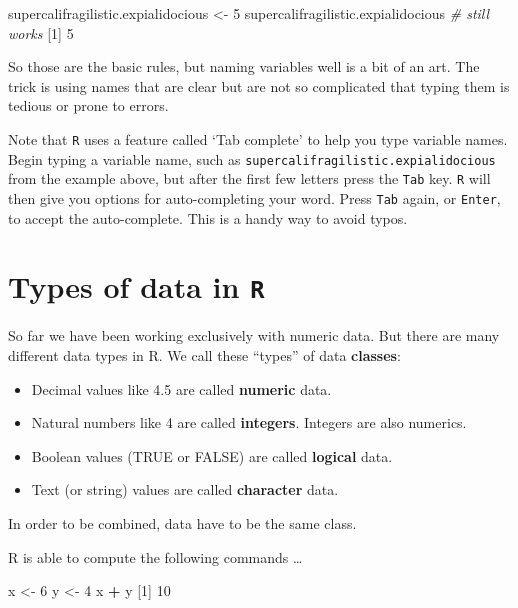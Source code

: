 \documentclass[]{book}
\newenvironment{Shaded}{\begin{snugshade}}{\end{snugshade}}
\newcommand{\CommentTok}[1]{\textcolor[rgb]{0.56,0.35,0.01}{\textit{#1}}}
\newcommand{\DecValTok}[1]{\textcolor[rgb]{0.00,0.00,0.81}{#1}}
\newcommand{\NormalTok}[1]{#1}
\newcommand{\OperatorTok}[1]{\textcolor[rgb]{0.81,0.36,0.00}{\textbf{#1}}}
\newcommand{\StringTok}[1]{\textcolor[rgb]{0.31,0.60,0.02}{#1}}
\providecommand{\tightlist}{%
  \setlength{\itemsep}{0pt}\setlength{\parskip}{0pt}}
\begin{document}
\begin{Shaded}
\begin{Highlighting}[]
\NormalTok{supercalifragilistic.expialidocious <-}\StringTok{ }\DecValTok{5}
\NormalTok{supercalifragilistic.expialidocious  }\CommentTok{# still works}
\NormalTok{[}\DecValTok{1}\NormalTok{] }\DecValTok{5}
\end{Highlighting}
\end{Shaded}

So those are the basic rules, but naming variables well is a bit of an art. The trick is using names that are clear but are not so complicated that typing them is tedious or prone to errors.

Note that \texttt{R} uses a feature called `Tab complete' to help you type variable names. Begin typing a variable name, such as \texttt{supercalifragilistic.expialidocious} from the example above, but after the first few letters press the \texttt{Tab} key. \texttt{R} will then give you options for auto-completing your word. Press \texttt{Tab} again, or \texttt{Enter}, to accept the auto-complete. This is a handy way to avoid typos.

\hypertarget{types-of-data-in-r}{%
\section*{\texorpdfstring{Types of data in \texttt{R}}{Types of data in R}}\label{types-of-data-in-r}}

So far we have been working exclusively with numeric data. But there are many different data types in R. We call these ``types'' of data \textbf{classes}:

\begin{itemize}
\tightlist
\item
  Decimal values like 4.5 are called \textbf{numeric} data.
\item
  Natural numbers like 4 are called \textbf{integers}. Integers are also numerics.
\item
  Boolean values (TRUE or FALSE) are called \textbf{logical} data.
\item
  Text (or string) values are called \textbf{character} data.
\end{itemize}

In order to be combined, data have to be the same class.

R is able to compute the following commands \ldots{}

\begin{Shaded}
\begin{Highlighting}[]
\NormalTok{x <-}\StringTok{ }\DecValTok{6}
\NormalTok{y <-}\StringTok{ }\DecValTok{4}
\NormalTok{x }\OperatorTok{+}\StringTok{ }\NormalTok{y}
\NormalTok{[}\DecValTok{1}\NormalTok{] }\DecValTok{10}
\end{Highlighting}
\end{Shaded}
\end{document}
